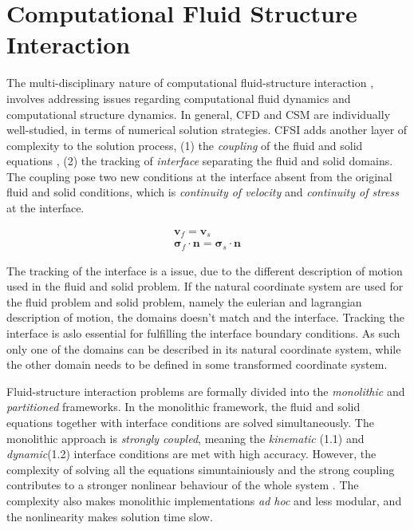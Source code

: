 \chapter{Computational Fluid Structure Interaction}

The multi-disciplinary nature of computational fluid-structure interaction , involves addressing issues regarding computational fluid dynamics and computational structure dynamics. In general, CFD and CSM are individually well-studied, in terms of numerical solution strategies. CFSI adds another layer of complexity to the solution process, (1) the \textit{coupling} of the fluid and solid equations , (2) the tracking of \textit{interface} separating the fluid and solid domains. The coupling pose two new conditions at the interface absent from the original fluid and solid conditions, which is \textit{continuity of velocity} and \textit{continuity of stress} at the interface.

\begin{align}
\mathbf{v}_f = \mathbf{v}_s \\
\mathbf{\sigma}_f \cdot \mathbf{n} = \mathbf{\sigma}_s \cdot \mathbf{n}
\label{sec:intcond}
\end{align}


The tracking of the interface is a issue, due to the different description of motion used in the fluid and solid problem. If the natural coordinate system are used for the fluid problem and solid problem, namely the eulerian and lagrangian description of motion, the domains doesn't match and the interface. Tracking the interface is aslo essential for fulfilling the interface boundary conditions. As such only one of the domains can be described in its natural coordinate system, while the other domain needs to be defined in some transformed coordinate system.    

Fluid-structure interaction problems are formally divided into the \textit{monolithic} and \textit{partitioned} frameworks.  In the monolithic framework, the fluid and solid equations together with interface conditions are solved simultaneously. The monolithic approach is  \textit{strongly coupled}, meaning the \textit{kinematic} (1.1) and \textit{dynamic}(1.2) interface conditions are met with high accuracy. However, the complexity of solving all the equations simuntainiously and the strong coupling contributes to a stronger nonlinear behaviour of the whole system \cite{Wick}. The complexity also makes monolithic implementations \textit{ad hoc} and less modular, and the nonlinearity makes solution time slow.

